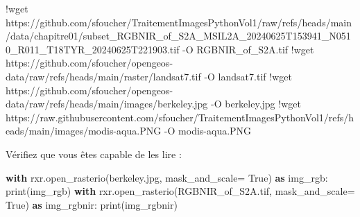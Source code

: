 \documentclass[
]{article}
\newenvironment{Shaded}{}{}
\newcommand{\BuiltInTok}[1]{\textcolor[rgb]{0.00,0.50,0.00}{#1}}
\newcommand{\ControlFlowTok}[1]{\textcolor[rgb]{0.00,0.44,0.13}{\textbf{#1}}}
\newcommand{\ImportTok}[1]{\textcolor[rgb]{0.00,0.50,0.00}{\textbf{#1}}}
\newcommand{\NormalTok}[1]{#1}
\newcommand{\OperatorTok}[1]{\textcolor[rgb]{0.40,0.40,0.40}{#1}}
\newcommand{\StringTok}[1]{\textcolor[rgb]{0.25,0.44,0.63}{#1}}
\newcommand{\VariableTok}[1]{\textcolor[rgb]{0.10,0.09,0.49}{#1}}
\begin{document}
\label{931f1be2}
\label{cb3}
\begin{Shaded}
\begin{Highlighting}[]
\OperatorTok{!}\NormalTok{wget https:}\OperatorTok{//}\NormalTok{github.com}\OperatorTok{/}\NormalTok{sfoucher}\OperatorTok{/}\NormalTok{TraitementImagesPythonVol1}\OperatorTok{/}\NormalTok{raw}\OperatorTok{/}\NormalTok{refs}\OperatorTok{/}\NormalTok{heads}\OperatorTok{/}\NormalTok{main}\OperatorTok{/}\NormalTok{data}\OperatorTok{/}\NormalTok{chapitre01}\OperatorTok{/}\NormalTok{subset\_RGBNIR\_of\_S2A\_MSIL2A\_20240625T153941\_N0510\_R011\_T18TYR\_20240625T221903.tif }\OperatorTok{{-}}\NormalTok{O RGBNIR\_of\_S2A.tif}
\OperatorTok{!}\NormalTok{wget https:}\OperatorTok{//}\NormalTok{github.com}\OperatorTok{/}\NormalTok{sfoucher}\OperatorTok{/}\NormalTok{opengeos}\OperatorTok{{-}}\NormalTok{data}\OperatorTok{/}\NormalTok{raw}\OperatorTok{/}\NormalTok{refs}\OperatorTok{/}\NormalTok{heads}\OperatorTok{/}\NormalTok{main}\OperatorTok{/}\NormalTok{raster}\OperatorTok{/}\NormalTok{landsat7.tif }\OperatorTok{{-}}\NormalTok{O landsat7.tif}
\OperatorTok{!}\NormalTok{wget https:}\OperatorTok{//}\NormalTok{github.com}\OperatorTok{/}\NormalTok{sfoucher}\OperatorTok{/}\NormalTok{opengeos}\OperatorTok{{-}}\NormalTok{data}\OperatorTok{/}\NormalTok{raw}\OperatorTok{/}\NormalTok{refs}\OperatorTok{/}\NormalTok{heads}\OperatorTok{/}\NormalTok{main}\OperatorTok{/}\NormalTok{images}\OperatorTok{/}\NormalTok{berkeley.jpg }\OperatorTok{{-}}\NormalTok{O berkeley.jpg}
\OperatorTok{!}\NormalTok{wget https:}\OperatorTok{//}\NormalTok{raw.githubusercontent.com}\OperatorTok{/}\NormalTok{sfoucher}\OperatorTok{/}\NormalTok{TraitementImagesPythonVol1}\OperatorTok{/}\NormalTok{refs}\OperatorTok{/}\NormalTok{heads}\OperatorTok{/}\NormalTok{main}\OperatorTok{/}\NormalTok{images}\OperatorTok{/}\NormalTok{modis}\OperatorTok{{-}}\NormalTok{aqua.PNG }\OperatorTok{{-}}\NormalTok{O modis}\OperatorTok{{-}}\NormalTok{aqua.PNG}
\end{Highlighting}
\end{Shaded}

Vérifiez que vous êtes capable de les lire :

\label{e2dfbaf4}
\label{cb4}
\begin{Shaded}
\begin{Highlighting}[]
\ControlFlowTok{with}\NormalTok{ rxr.open\_rasterio(}\StringTok{\textquotesingle{}berkeley.jpg\textquotesingle{}}\NormalTok{, mask\_and\_scale}\OperatorTok{=} \VariableTok{True}\NormalTok{) }\ImportTok{as}\NormalTok{ img\_rgb:}
    \BuiltInTok{print}\NormalTok{(img\_rgb)}
\ControlFlowTok{with}\NormalTok{ rxr.open\_rasterio(}\StringTok{\textquotesingle{}RGBNIR\_of\_S2A.tif\textquotesingle{}}\NormalTok{, mask\_and\_scale}\OperatorTok{=} \VariableTok{True}\NormalTok{) }\ImportTok{as}\NormalTok{ img\_rgbnir:}
    \BuiltInTok{print}\NormalTok{(img\_rgbnir)}
\end{Highlighting}
\end{Shaded}
\end{document}
